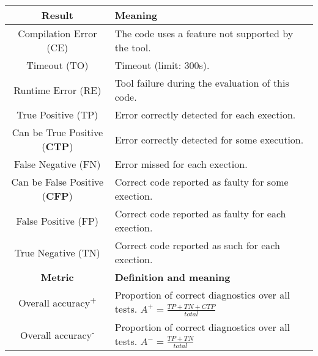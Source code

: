 \begin{tabular}{|c|l|}\hline
  \textbf{Result}&\textbf{Meaning}\\\hline
  Compilation Error (CE) &The code uses a feature not supported by the tool.\\\hline
  Timeout (TO) & Timeout (limit: 300s).\\\hline
  Runtime Error (RE) & Tool failure during the evaluation of this code.\\\hline\hline
  True Positive (TP)&Error correctly detected for each exection.\\\hline
  Can be True Positive (\textbf{CTP})&Error correctly detected for some execution.\\\hline
  False Negative (FN)&Error missed for each exection.\\\hline
  Can be False Positive (\textbf{CFP})&Correct code reported as faulty for some exection.\\\hline
  False Positive (FP)&Correct code reported as faulty for each exection.\\\hline
  True Negative (TN) &Correct code reported as such for each exection.\\\hline\hline
  \textbf{Metric}&\textbf{Definition and meaning}\\\hline
  Overall accuracy\textsuperscript{+}&\multirow{1.3}{*}{Proportion of correct diagnostics over all tests. $A^+=\frac{TP+TN+CTP}{total}$}\\[4pt]\hline
  Overall accuracy\textsuperscript{-}&\multirow{1.3}{*}{Proportion of correct diagnostics over all tests. $A^-=\frac{TP+TN}{total}$}\\[4pt]\hline

\end{tabular}
